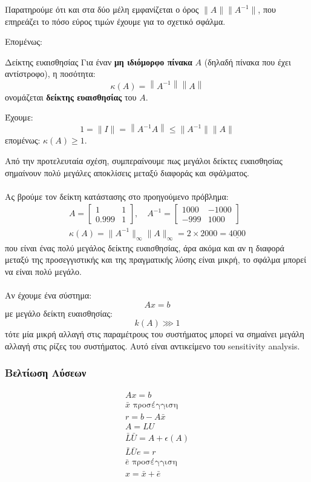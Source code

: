 \documentclass[11pt,a4paper,notitlepage,fleqn]{article}
\begin{document}
Παρατηρούμε ότι και στα δύο μέλη εμφανίζεται ο όρος
\( \lVert A\rVert\lVert A^{-1}\rVert \), που επηρεάζει το πόσο
εύρος τιμών έχουμε για το σχετικό σφάλμα.

Επομένως:

\begin{defn}{Δείκτης ευαισθησίας}{}
	Για έναν \textbf{μη ιδιόμορφο πίνακα} \( A \) (δηλαδή πίνακα
	που έχει αντίστροφο), η ποσότητα:
	\[
	\kappa(A) = \left\lVert A^{-1} \right\rVert
	\left\lVert A \right\rVert
	\]
	ονομάζεται \textbf{δείκτης ευαισθησίας} του \( A \).
\end{defn}

Έχουμε:
\[
1 = \lVert I \rVert = \left\lVert A^{-1} A \right\rVert 
\leq \lVert A^{-1} \rVert \lVert A\rVert
\]
επομένως: \( \kappa(A) \geq 1 \).

Από την προτελευταία σχέση, συμπεραίνουμε πως μεγάλοι δείκτες
ευαισθησίας σημαίνουν πολύ μεγάλες αποκλίσεις μεταξύ διαφοράς
και σφάλματος.

\paragraph{}
Ας βρούμε τον δείκτη κατάστασης στο προηγούμενο πρόβλημα:
\begin{gather*}
	A = \left[\begin{matrix}
	1 & 1 \\ 0.999 & 1
	\end{matrix}\right], \quad A^{-1}=\left[\begin{matrix}
	1000 & -1000 \\ -999 & 1000
	\end{matrix}\right] \\
	\kappa (A) = \lVert A^{-1} \rVert_{\infty}\lVert A\rVert_{\infty}
	= 2 \times 2000 = \underline{4000}
\end{gather*}
που είναι ένας πολύ μεγάλος δείκτης ευαισθησίας, άρα ακόμα και αν η
διαφορά μεταξύ της προσεγγιστικής και της πραγματικής λύσης είναι μικρή,
το σφάλμα μπορεί να είναι πολύ μεγάλο.

\paragraph{}
Αν έχουμε ένα σύστημα:
\[
Ax = b
\]
με μεγάλο δείκτη ευαισθησίας:
\[
k(A) \ggg 1
\]
τότε μία μικρή αλλαγή στις παραμέτρους του συστήματος μπορεί να
σημαίνει μεγάλη αλλαγή στις ρίζες του συστήματος. Αυτό είναι αντικείμενο
του sensitivity analysis.

\subsubsection{Βελτίωση Λύσεων}
\begin{gather*}
	Ax = b \\
	\bar x \text{ προσέγγιση}\\
	r = b- A\bar x\\
	A=LU\\
	\bar L\bar U = A +\epsilon(A)\\
	\bar L \bar U e = r\\
	\bar e \text{ προσέγγιση} \\
	x = \bar x + \bar e
\end{gather*}
\end{document}
